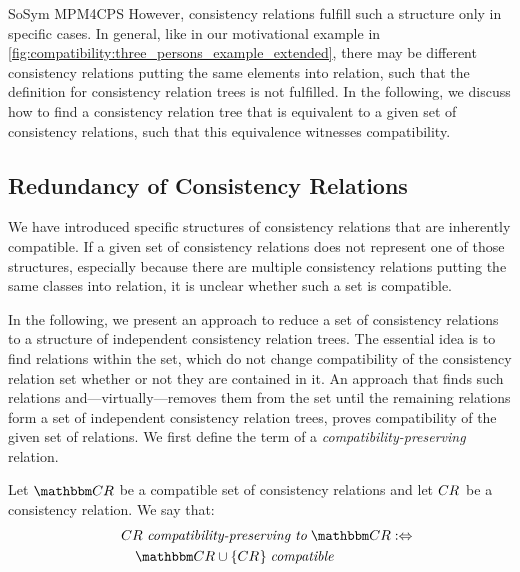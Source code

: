 \begin{copiedFrom}{SoSym MPM4CPS}
However, consistency relations fulfill such a structure only in specific cases.
In general, like in our motivational example in \autoref{fig:compatibility:three_persons_example_extended}, there may be different consistency relations putting the same elements into relation, such that the definition for consistency relation trees is not fulfilled.
In the following, we discuss how to find a consistency relation tree that is equivalent to a given set of consistency relations, such that this equivalence witnesses compatibility.



\subsection{Redundancy of Consistency Relations}
\label{sec:formalapproach:redundancy}


We have introduced specific structures of consistency relations that are inherently compatible.
If a given set of consistency relations does not represent one of those structures, especially because there are multiple consistency relations putting the same classes into relation, it is unclear whether such a set is compatible.

In the following, we present an approach to reduce a set of consistency relations to a structure of independent consistency relation trees.
The essential idea is to find relations within the set, which do not change compatibility of the consistency relation set whether or not they are contained in it.
An approach that finds such relations and---virtually---removes them from the set until the remaining relations form a set of independent consistency relation trees, proves compatibility of the given set of relations.
We first define the term of a \emph{compatibility-preserving} relation.

\begin{definition}
    \label{def:compatibilitypreserving}
    Let $\consistencyrelationset{CR}$ be a compatible set of consistency relations and let $CR_{}$ be a consistency relation. We say that:
    \begin{align*}
        \formulaskip &
        \consistencyrelation{CR}{} \compatibilitypreservingtomath \consistencyrelationset{CR} \equivalentperdefinition \\
        & \formulaskip
        \consistencyrelationset{CR} \cup \setted{\consistencyrelation{CR}{}} \compatiblemath
    \end{align*}
\end{definition}


\end{copiedFrom}

